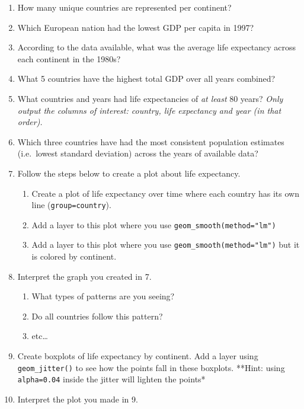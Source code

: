 \documentclass[]{article}
\providecommand{\tightlist}{%
  \setlength{\itemsep}{0pt}\setlength{\parskip}{0pt}}
\begin{document}
\begin{enumerate}
\def\labelenumi{\arabic{enumi}.}
\tightlist
\item
  How many unique countries are represented per continent?
\item
  Which European nation had the lowest GDP per capita in 1997?
\item
  According to the data available, what was the average life expectancy
  across each continent in the 1980s?
\item
  What 5 countries have the highest total GDP over all years combined?
\item
  What countries and years had life expectancies of \emph{at least} 80
  years? \emph{Only output the columns of interest: country, life
  expectancy and year (in that order).}
\item
  Which three countries have had the most consistent population
  estimates (i.e.~lowest standard deviation) across the years of
  available data?
\item
  Follow the steps below to create a plot about life expectancy.

  \begin{enumerate}
  \def\labelenumii{\alph{enumii}.}
  \tightlist
  \item
    Create a plot of life expectancy over time where each country has
    its own line (\texttt{group=country}).\\
  \item
    Add a layer to this plot where you use
    \texttt{geom\_smooth(method="lm")}
  \item
    Add a layer to this plot where you use
    \texttt{geom\_smooth(method="lm")} but it is colored by continent.
  \end{enumerate}
\item
  Interpret the graph you created in 7.

  \begin{enumerate}
  \def\labelenumii{\alph{enumii}.}
  \tightlist
  \item
    What types of patterns are you seeing?
  \item
    Do all countries follow this pattern?
  \item
    etc\ldots{}
  \end{enumerate}
\item
  Create boxplots of life expectancy by continent. Add a layer using
  \texttt{geom\_jitter()} to see how the points fall in these boxplots.
  **Hint: using \texttt{alpha=0.04} inside the jitter will lighten the
  points*
\item
  Interpret the plot you made in 9.
\end{enumerate}
\end{document}
